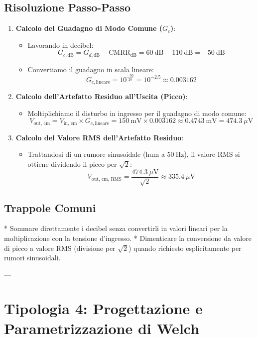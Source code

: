\documentclass[10pt, letterpaper]{report}
\begin{document}
\subsection*{Risoluzione Passo-Passo}
\begin{enumerate}
    \item \textbf{Calcolo del Guadagno di Modo Comune ($G_c$)}:
    \begin{itemize}
        \item Lavorando in decibel:
        \[
        G_{c,\text{dB}} = G_{d,\text{dB}} - \text{CMRR}_{\text{dB}} = 60\ \text{dB} - 110\ \text{dB} = -50\ \text{dB}
        \]
        \item Convertiamo il guadagno in scala lineare:
        \[
        G_{c,\text{lineare}} = 10^{\frac{-50}{20}} = 10^{-2.5} \approx 0.003162
        \]
    \end{itemize}
    \item \textbf{Calcolo dell'Artefatto Residuo all'Uscita (Picco)}:
    \begin{itemize}
        \item Moltiplichiamo il disturbo in ingresso per il guadagno di modo comune:
        \[
        V_{\text{out, cm}} = V_{\text{in, cm}} \times G_{c,\text{lineare}} = 150\ \text{mV} \times 0.003162 \approx 0.4743\ \text{mV} = 474.3\ \mu\text{V}
        \]
    \end{itemize}
    \item \textbf{Calcolo del Valore RMS dell'Artefatto Residuo}:
    \begin{itemize}
        \item Trattandosi di un rumore sinusoidale (hum a $50\ \text{Hz}$), il valore RMS si ottiene dividendo il picco per $\sqrt{2}$:
        \[
        V_{\text{out, cm, RMS}} = \frac{474.3\ \mu\text{V}}{\sqrt{2}} \approx 335.4\ \mu\text{V}
        \]
    \end{itemize}
\end{enumerate}

\subsection*{Trappole Comuni}
* Sommare direttamente i decibel senza convertirli in valori lineari per la moltiplicazione con la tensione d'ingresso.
* Dimenticare la conversione da valore di picco a valore RMS (divisione per $\sqrt{2}$) quando richiesto esplicitamente per rumori sinusoidali.

---

\section{Tipologia 4: Progettazione e Parametrizzazione di Welch}
\end{document}
